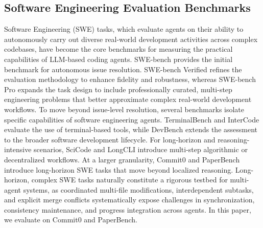 

\subsection{Software Engineering Evaluation Benchmarks}
Software Engineering (SWE) tasks, which evaluate agents on their ability to autonomously carry out diverse real-world development activities across complex codebases, have become the core benchmarks for measuring the practical capabilities of LLM-based coding agents. SWE-bench \cite{jimenez2023swe} provides the initial benchmark for autonomous issue resolution. SWE-bench Verified \cite{chowdhury2024swebenchverified} refines the evaluation methodology to enhance fidelity and robustness, whereas SWE-bench Pro \cite{deng2025swe} expands the task design to include professionally curated, multi-step engineering problems that better approximate complex real-world development workflows. To move beyond issue-level resolution, several benchmarks isolate specific capabilities of software engineering agents. TerminalBench \cite{merrill2026terminal} and InterCode \cite{yang2023intercode} evaluate the use of terminal-based tools, while DevBench \cite{li2024devbench} extends the assessment to the broader software development lifecycle. For long-horizon and reasoning-intensive scenarios, SciCode \citep{tian2024scicode} and LongCLI \citep{feng2026longcli} introduce multi-step algorithmic or decentralized workflows. At a larger granularity, Commit0 \cite{zhao2024commit0} and PaperBench \cite{starace2025paperbench} introduce long-horizon SWE tasks that move beyond localized reasoning. Long-horizon, complex SWE tasks naturally constitute a rigorous testbed for multi-agent systems, as coordinated multi-file modifications, interdependent subtasks, and explicit merge conflicts systematically expose challenges in synchronization, consistency maintenance, and progress integration across agents. In this paper, we evaluate \ourmethod on Commit0 and PaperBench.



